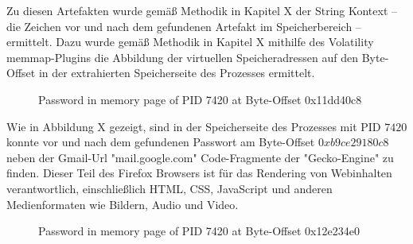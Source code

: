 Zu diesen Artefakten wurde gemäß Methodik in Kapitel X der String Kontext -- die Zeichen vor und nach dem gefundenen Artefakt im Speicherbereich -- ermittelt. Dazu wurde gemäß Methodik in Kapitel X mithilfe des Volatility memmap-Plugins die Abbildung der virtuellen Speicheradressen auf den Byte-Offset in der extrahierten Speicherseite des Prozesses ermittelt. 
\begin{figure}[h!]
	\centerline{}
	\label{chart:final-criteria}  
	\caption{Password in memory page of PID 7420 at Byte-Offset 0x11dd40c8}
\end{figure}
Wie in Abbildung X gezeigt, sind in der Speicherseite des Prozesses mit PID $7420$ konnte vor und nach dem gefundenen Passwort am Byte-Offset $0xb9ce29180c8$ neben der Gmail-Url "mail.google.com" Code-Fragmente der "Gecko-Engine" zu finden. Dieser Teil des Firefox Browsers ist für das Rendering von Webinhalten verantwortlich, einschließlich HTML, CSS, JavaScript und anderen Medienformaten wie Bildern, Audio und Video.
\begin{figure}[h!]
	\centerline{}
	\label{chart:final-criteria}  
	\caption{Password in memory page of PID 7420 at Byte-Offset 0x12e234e0}
\end{figure}
